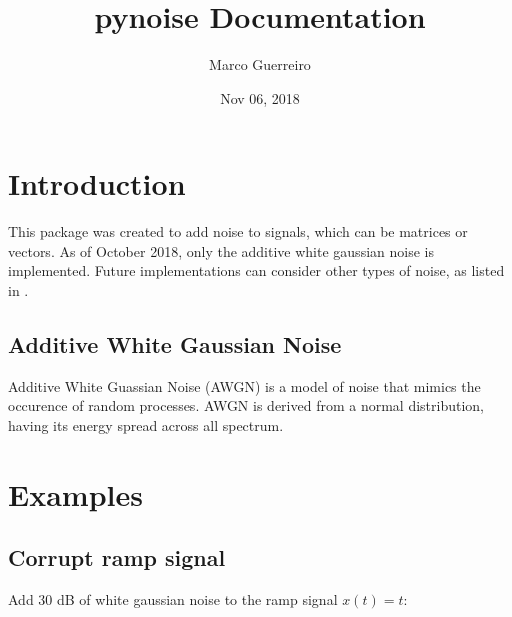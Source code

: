 \documentclass[letterpaper,10pt,english]{sphinxmanual}
\title{pynoise Documentation}
\date{Nov 06, 2018}
\author{Marco Guerreiro}
\begin{document}
\pagestyle{empty}
\maketitle
\pagestyle{plain}
\sphinxtableofcontents
\pagestyle{normal}
\label{\detokenize{index::doc}}



\chapter{Introduction}
\label{\detokenize{intro:introduction}}\label{\detokenize{intro::doc}}
This package was created to add noise to signals, which can be matrices or
vectors. As of October 2018, only the additive white gaussian noise is
implemented. Future implementations can consider other types of noise, as
listed in .


\section{Additive White Gaussian Noise}
\label{\detokenize{intro:additive-white-gaussian-noise}}
Additive White Guassian Noise (AWGN) is a model of noise that mimics the occurence of random
processes. AWGN is derived from a normal distribution, having its energy spread across all
spectrum.


\chapter{Examples}
\label{\detokenize{examples:examples}}\label{\detokenize{examples::doc}}

\section{Corrupt ramp signal}
\label{\detokenize{examples:corrupt-ramp-signal}}
Add 30 dB of white gaussian noise to the ramp signal \(x(t) = t\):
\end{document}
